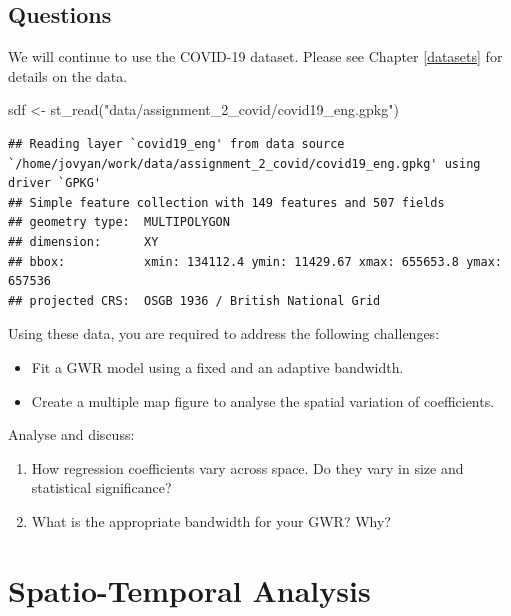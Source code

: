 \documentclass[
]{book}
\newenvironment{Shaded}{\begin{snugshade}}{\end{snugshade}}
\newcommand{\FunctionTok}[1]{\textcolor[rgb]{0.00,0.00,0.00}{#1}}
\newcommand{\NormalTok}[1]{#1}
\newcommand{\OtherTok}[1]{\textcolor[rgb]{0.56,0.35,0.01}{#1}}
\newcommand{\StringTok}[1]{\textcolor[rgb]{0.31,0.60,0.02}{#1}}
\providecommand{\tightlist}{%
  \setlength{\itemsep}{0pt}\setlength{\parskip}{0pt}}
\begin{document}
\hypertarget{questions-5}{%
\section{Questions}\label{questions-5}}

We will continue to use the COVID-19 dataset. Please see Chapter \ref{datasets} for details on the data.

\begin{Shaded}
\begin{Highlighting}[]
\NormalTok{sdf }\OtherTok{\textless{}{-}} \FunctionTok{st\_read}\NormalTok{(}\StringTok{"data/assignment\_2\_covid/covid19\_eng.gpkg"}\NormalTok{)}
\end{Highlighting}
\end{Shaded}

\begin{verbatim}
## Reading layer `covid19_eng' from data source `/home/jovyan/work/data/assignment_2_covid/covid19_eng.gpkg' using driver `GPKG'
## Simple feature collection with 149 features and 507 fields
## geometry type:  MULTIPOLYGON
## dimension:      XY
## bbox:           xmin: 134112.4 ymin: 11429.67 xmax: 655653.8 ymax: 657536
## projected CRS:  OSGB 1936 / British National Grid
\end{verbatim}

Using these data, you are required to address the following challenges:

\begin{itemize}
\item
  Fit a GWR model using a fixed and an adaptive bandwidth.
\item
  Create a multiple map figure to analyse the spatial variation of coefficients.
\end{itemize}

Analyse and discuss:

\begin{enumerate}
\def\labelenumi{\arabic{enumi}.}
\tightlist
\item
  How regression coefficients vary across space. Do they vary in size and statistical significance?
\item
  What is the appropriate bandwidth for your GWR? Why?
\end{enumerate}

\hypertarget{sta}{%
\chapter{Spatio-Temporal Analysis}\label{sta}}
\end{document}
